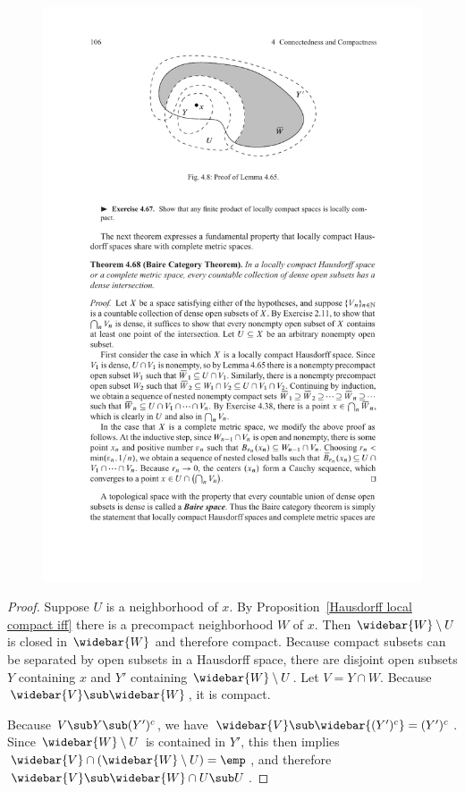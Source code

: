 \begin{figure}[htbp]
\centering
\includegraphics{pictures/local-compact}
\end{figure}
\begin{proof}
Suppose $U$ is a neighborhood of $x$. By Proposition~\ref{Hausdorff local compact iff} there is a precompact neighborhood $W$ of $x$. Then $\widebar{W}\setminus U$ is closed in $\widebar{W}$ and therefore compact. Because compact subsets can be separated by open subsets in a Hausdorff space, there are disjoint open subsets $Y$ containing $x$ and $Y'$ containing $\widebar{W}\setminus U$. Let $V=Y\cap W$. Because $\widebar{V}\sub\widebar{W}$, it is compact.\par
Because $V\sub Y\sub(Y')^c$, we have $\widebar{V}\sub\widebar{(Y')^c}=(Y')^c$. Since $\widebar{W}\setminus U$ is contained in $Y'$, this then implies $\widebar{V}\cap(\widebar{W}\setminus U)=\emp$, and therefore $\widebar{V}\sub\widebar{W}\cap U\sub U$.
\end{proof}
